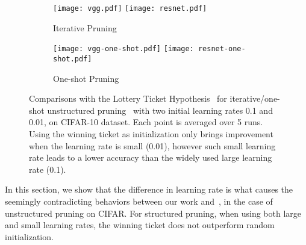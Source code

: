 \begin{figure*}[!ht]
\centering
\begin{minipage}{0.96\textwidth}
 \begin{subfigure}{\textwidth}
 \centering
 \texttt{[image: vgg.pdf]}
 \texttt{[image: resnet.pdf]}
 \caption{Iterative Pruning}
 \label{iterative-1}
 \end{subfigure}
\end{minipage}
 \begin{minipage}{0.96\textwidth}
 \begin{subfigure}{\textwidth}
 \centering
 \texttt{[image: vgg-one-shot.pdf]}
 \texttt{[image: resnet-one-shot.pdf]}
 \caption{One-shot Pruning}
 \label{iterative-3}
 \end{subfigure}
\end{minipage}
    \caption{
    Comparisons with the Lottery Ticket Hypothesis~\cite{lottery} for iterative/one-shot unstructured  pruning~\cite{han2015learning} with two initial learning rates 0.1 and 0.01, on CIFAR-10 dataset. Each point is averaged over 5 runs. Using the winning ticket as initialization only brings improvement when the learning rate is small (0.01), however such small learning rate leads to a lower accuracy than the widely used large learning rate (0.1).}
    \label{lottery-figure-1}
\end{figure*}



In this section, we show that the difference in learning rate is what causes the seemingly contradicting behaviors between our work and~\cite{lottery}, in the case of unstructured pruning on CIFAR. For structured pruning, when using both large and small learning rates, the winning ticket does not outperform random initialization.


